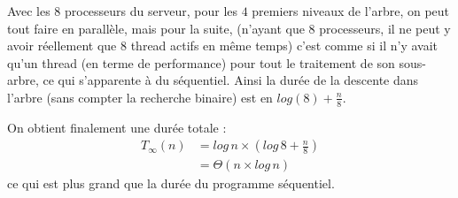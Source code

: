 

Avec les $8$ processeurs du serveur, pour les $4$ premiers niveaux de l'arbre, on peut tout faire en parallèle, mais pour la suite, (n'ayant que $8$ processeurs, il ne peut y avoir réellement que $8$ thread actifs en même temps) c'est comme si il n'y avait qu'un thread (en terme de performance) pour tout le traitement de son sous-arbre, ce qui s'apparente à du séquentiel. Ainsi la durée de la descente dans l'arbre (sans compter la recherche binaire) est en $log(8) + \frac{n}{8}$.

On obtient finalement une durée totale :
\begin{equation} \label{eq-q2}
\begin{split}
T_\infty(n) & = log \, n \times (log \, 8 + \frac{n}{8})\\ 
 & = \Theta (n \times log \, n)
\end{split}
\end{equation}
 ce qui est plus grand que la durée du programme séquentiel.